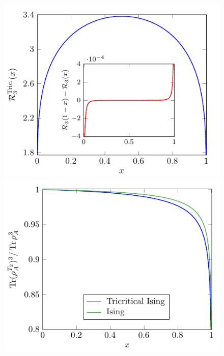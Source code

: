 \documentclass[a4paper,11pt]{article}
\begin{document}
\begin{figure}[t]
 \begin{minipage}{0.5\linewidth}
 \centering 
 \includegraphics[width=\textwidth]{renyi_entropy_3_tricritical.pdf}
\end{minipage}
 \begin{minipage}{0.5\linewidth}
 \centering 
 \includegraphics[width=\textwidth]{quotient_negativity_entropy_3_tricritical.pdf}
\end{minipage}
\caption{}\label{fig:ent_tricritical}
\end{figure}
\end{document}

